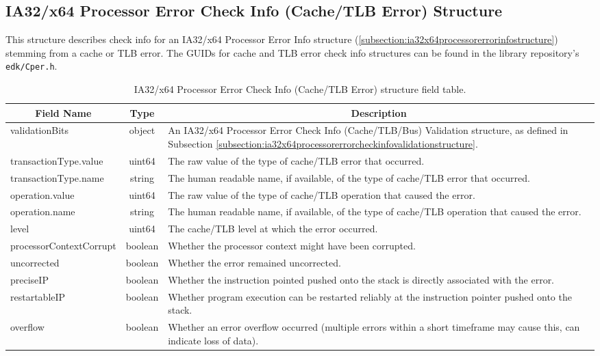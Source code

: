 \documentclass{report}
\newcommand*{\thead}[1]{\multicolumn{1}{|c|}{\bfseries #1}}
\newcommand*{\jsontable}[1]{
    \begin{table}[!ht]
    \label{#1}
    \centering
    \begin{adjustbox}{center}
    \begin{tabular}{|l|c|p{8cm}|}
    \hline
    \thead{Field Name} & \thead{Type} & \thead{Description} \\
    \hline
}
\newcommand*{\jsontableend}[1]{
    \hline
    \end{tabular}
    \end{adjustbox}
    \caption{#1}
    \label{table:#1}
    \end{table}
    \FloatBarrier
}
\begin{document}
\subsection{IA32/x64 Processor Error Check Info (Cache/TLB Error) Structure}
\label{subsection:ia32x64processorerrorcheckinfocachetlbstructure}
This structure describes check info for an IA32/x64 Processor Error Info structure (\ref{subsection:ia32x64processorerrorinfostructure}) stemming from a cache or TLB error.
The GUIDs for cache and TLB error check info structures can be found in the library repository's \texttt{edk/Cper.h}.
\jsontable{table:ia32x64processorerrorcheckinfocachetlbstructure}
validationBits & object & An IA32/x64 Processor Error Check Info (Cache/TLB/Bus) Validation structure, as defined in Subsection \ref{subsection:ia32x64processorerrorcheckinfovalidationstructure}.\\
\hline
transactionType.value & uint64 & The raw value of the type of cache/TLB error that occurred.\\
transactionType.name & string & The human readable name, if available, of the type of cache/TLB error that occurred.\\
\hline
operation.value & uint64 & The raw value of the type of cache/TLB operation that caused the error.\\
operation.name & string & The human readable name, if available, of the type of cache/TLB operation that caused the error.\\
\hline
level & uint64 & The cache/TLB level at which the error occurred.\\
\hline
processorContextCorrupt & boolean & Whether the processor context might have been corrupted.\\
\hline
uncorrected & boolean & Whether the error remained uncorrected.\\
\hline
preciseIP & boolean & Whether the instruction pointed pushed onto the stack is directly associated with the error.\\
\hline
restartableIP & boolean & Whether program execution can be restarted reliably at the instruction pointer pushed onto the stack.\\
\hline
overflow & boolean & Whether an error overflow occurred (multiple errors within a short timeframe may cause this, can indicate loss of data).\\
\jsontableend{IA32/x64 Processor Error Check Info (Cache/TLB Error) structure field table.}

\end{document}
